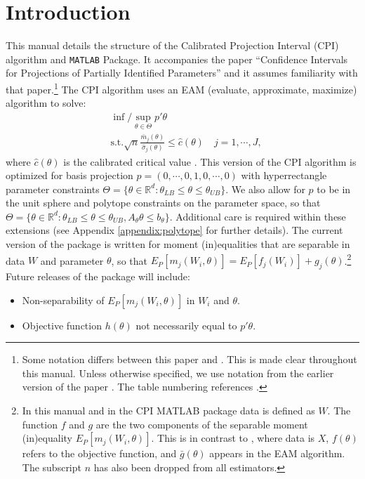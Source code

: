 \documentclass[12pt]{article}
\def\code#1{\texttt{#1}}
\begin{document}
\section{Introduction} \label{sec:introduction}
This manual details the structure of the Calibrated Projection Interval (CPI) algorithm and \code{MATLAB} Package.  It accompanies the paper ``Confidence Intervals for Projections of Partially Identified Parameters'' \cite{kaido2019confidence} and it assumes familiarity with that paper.\footnote{Some notation differs between this paper and \cite{kaido2019confidence}.  This is made clear throughout this manual.  Unless otherwise specified, we use notation from the earlier version of the paper \cite{kaido2016confidence}.  The table numbering references  \cite{kaido2019confidence}.}  The CPI algorithm uses an EAM (evaluate, approximate, maximize) algorithm to solve:
\begin{align*}
& \inf/\sup_{\theta \in \Theta} p'\theta \\
& \text{s.t.} \sqrt{n} \frac{\bar m_{j}(\theta)}{\hat \sigma_{j}(\theta)} \leq \hat c(\theta) \quad j=1,\cdots,J,
\end{align*}
where $\hat c(\theta)$ is the calibrated critical value \cite{jones1998efficient,jones2001taxonomy}.  This version of the CPI algorithm is optimized for basis projection $p = (0,\cdots,0,1,0,\cdots,0)$ with hyperrectangle parameter constraints $\Theta = \{\theta \in \mathbb{R}^d: \theta_{LB} \leq \theta \leq  \theta_{UB}\}$.  We also allow for $p$ to be in the unit sphere and polytope constraints on the parameter space, so that
$\Theta = \{\theta \in \mathbb{R}^d: \theta_{LB} \leq \theta \leq  \theta_{UB}, A_{\theta} \theta \leq b_{\theta}\}$.  Additional care is required within these extensions (see Appendix \ref{appendix:polytope} for further details).   The current version of the package is written for moment (in)equalities that are separable in data $W$ and parameter $\theta$, so that $E_P[m_j(W_i,\theta)] = E_P[f_j(W_i)] + g_j(\theta)$.\footnote{In this manual and in the CPI MATLAB package data is defined as $W$.  The function $f$ and $g$ are the two components of the separable moment (in)equality $E_P[m_j(W_i,\theta)]$.  This is in contrast to , where data is $X$, $f(\theta)$ refers to the objective function, and $\bar g(\theta)$ appears in the EAM algorithm.  The subscript $n$ has also been dropped from all estimators.} Future releases of the package will include:
\begin{itemize}
\item Non-separability of $E_P[m_j(W_i,\theta)]$ in $W_i$ and $\theta$.
\item Objective function $h(\theta)$ not necessarily equal to $p'\theta$.
\end{itemize}
\end{document}
